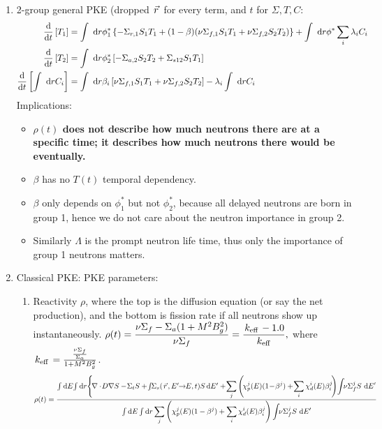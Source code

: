 \documentclass{school-22.211-notes}
\begin{document}
\begin{enumerate}
\item 2-group general PKE (dropped $\left.\vec{r}\right.$ for every term, and $t$ for $\Sigma, T, C$:
  \small
  \begin{align}
  \frac{\mathrm{d}}{\mathrm{d}t} \left[ T_1\right] &=   \int \mbox{ }\mathrm{d} r  \phi_1^*  \left\{  - \Sigma_{r,1}  S_1 T_1  + (1-\beta) (\nu \Sigma_{f,1} S_{1}  T_{1} + \nu \Sigma_{f,2} S_2 T_2 ) \right\} + \int \mbox{ }\mathrm{d} r \phi^*  \displaystyle\sum_i \lambda_i C_i     \\
   \frac{\mathrm{d}}{\mathrm{d}t} \left[ T_2 \right] &=  
    \int \mbox{ }\mathrm{d} r  \phi_2^*  \left[ - \Sigma_{a,2}  S_2 T_2 + \Sigma_{s12}  S_1 T_1  \right]   \\
   \frac{\mathrm{d}}{\mathrm{d}t} \left[ \int \mbox{ }\mathrm{d} r C_i \right] &=   \int \mbox{ }\mathrm{d} r \beta_i\left[ \nu \Sigma_{f,1} S_1 T_1 + \nu \Sigma_{f,2}  S_2  T_2 \right]   - \lambda_i \int \mbox{ }\mathrm{d} r C_i 
  \end{align}
  \normalsize
  Implications:
  \begin{itemize}
  \item \textbf{$\rho(t)$ does not describe how much neutrons there are at a specific time; it describes how much neutrons there would be eventually.} 
  \item $\beta$ has no $T(t)$ temporal dependency. 
  \item $\beta$ only depends on $\phi_1^*$ but not $\phi_2^*$, because all delayed neutrons are born in group 1, hence we do not care about the neutron importance in group 2. 
  \item Similarly $\Lambda$ is the prompt neutron life time, thus only the importance of group 1 neutrons matters. 
  \end{itemize}

\item Classical PKE:
    PKE parameters: 
      \begin{enumerate}
      \item Reactivity $\rho$, where the top is the diffusion equation (or say the net production), and the bottom is fission rate if all neutrons show up instantaneously. $\displaystyle  \rho(t) = \frac{\nu \Sigma_f - \Sigma_a(1 + M^2 B_g^2)}{\nu \Sigma_f} = \frac{\left. k_{\mathrm{eff}} \right. - 1.0}{\left. k_{\mathrm{eff}} \right.},$ where $\left. k_{\mathrm{eff}} \right. = \frac{\frac{\nu \Sigma_f}{\Sigma_a}}{1 + M^2 B_g^2}$. 
        \scriptsize
        \begin{align}
          \rho (t) &= \frac{\int \bsp \dE \! \int \bsp \dr \Bigg\{ \!\divergence \! D  \gradient S  - \! \Sigma_t S  + \! \int \bsp \Sigma_s (\vecr \!, E' \bsp \to \bsp E, t) S \! \dE'   
            + \! \Sum_j \left( \! \chi_p^j (E) (1 \! - \! \beta^j) +  \! \Sum_i \chi_d^i (E) \beta_i^j \! \right) \! \int \bsp \nu \Sigma_f^j  S \dE'  }{\int \bsp \dE \int \bsp \dr \Sum_j \left( \chi_p^j (E) (1-\beta^j) + \Sum_i \chi_d^i (E) \beta_i^j \right) \int \bsp \nu \Sigma_f^j S \dE'} 
        \end{align}
        \normalsize


\end{enumerate}
\end{enumerate}
\end{document}
